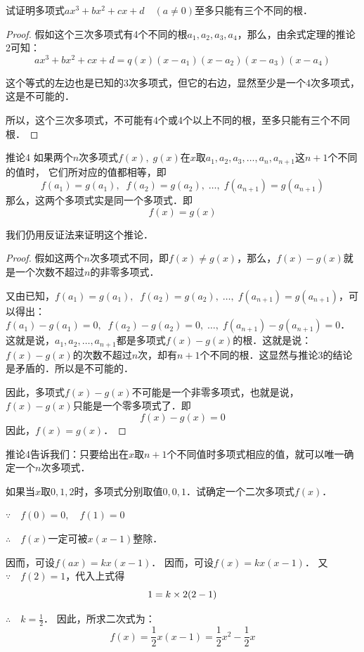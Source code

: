 \begin{example}
    试证明多项式$ax^3+bx^2+cx+d\quad (a\ne 0)$至多只能有三个不同的根．
\end{example}


\begin{proof}
    假如这个三次多项式有4个不同的根$a_1,a_2,a_3,a_4$，那么，由余式定理的推论2可知：
\[ax^3+bx^2+cx+d=q (x) (x-a_1) (x-a_2) (x-a_3) (x-a_4)\]

这个等式的左边也是已知的3次多项式，但它的右边，显然至少是一个4次多项式，这是不可能的．

所以，这个三次多项式，不可能有4个或4个以上不同的根，至多只能有三个不同根．
\end{proof}


\begin{blk}{推论4}
    如果两个$n$次多项式$f(x),\; g(x)$在$x$取$a_1,a_2,a_3,\ldots,a_n,a_{n+1}$这$n+1$个不同的值时，
    它们所对应的值都相等，即
\[f (a_1) =g (a_1) ,\; \; f (a_2) =g (a_2) ,\;  \ldots,\;  f (a_{n+1}) =g (a_{n+1}) \]
那么，这两个多项式实是同一个多项式．即
\[f (x) =g (x) \]
\end{blk}

我们仍用反证法来证明这个推论．

\begin{proof}
假如这两个$n$次多项式不同，即$f(x)\ne g(x)$，那么，$f(x)-g(x)$就是一个次数不超过$n$的非零多项式．

又由已知，$f (a_1) =g (a_1) ,\; \; f (a_2) =g (a_2) ,\;  \ldots,\;  f (a_{n+1}) =g (a_{n+1})$，可以得出：$f (a_1) -g (a_1)=0 ,\; \; f (a_2) -g (a_2)=0 ,\;  \ldots,\;  f (a_{n+1}) -g (a_{n+1})=0$．这就是说，$a_1,a_2,\ldots,a_{n+1}$都是多项式$f(x)-g(x)$的根．这就是说：$f(x)-g(x)$的次数不超过$n$次，却有$n+1$个不同的根．这显然与推论3的结论是矛盾的．所以是不可能的．

因此，多项式$f(x)-g(x)$不可能是一个非零多项式，也就是说，$f(x)-g(x)$只能是一个零多项式了．即
\[f (x) -g (x) =0\]
因此，$f(x)=g(x)$．

\end{proof}

推论4告诉我们：只要给出在$x$取$n+1$个不同值时多项式相应的值，就可以唯一确定一个$n$次多项式．

\begin{example}
如果当$x$取$0, 1, 2$时，多项式分别取值$0,0,1$．试确定一个二次多项式$f(x)$．
\end{example}


\begin{solution}
$\because\quad f(0)=0,\quad f(1)=0$

$\therefore\quad f(x)$一定可被$x(x-1)$整除．

因而，可设$f(ax)=kx(x-1)$．
因而，可设$f(x)=kx(x-1)$．
又$\because\quad f(2)=1$，代入上式得
\[1=k\times2 (2-1) \]

$\therefore\quad k=\frac{1}{2}$．
因此，所求二次式为：
\[f(x)=\frac{1}{2}x(x-1)=\frac{1}{2}x^2-\frac{1}{2}x\]
\end{solution}

